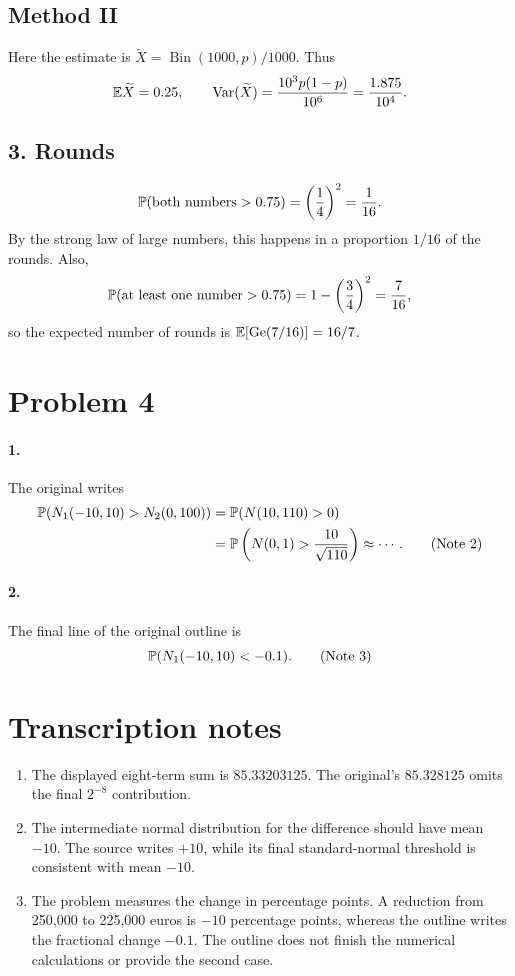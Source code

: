 \documentclass[11pt,a4paper]{article}
\begin{document}
\subsection*{Method II}
Here the estimate is $\widetilde X=\operatorname{Bin}(1000,p)/1000$. Thus
\[
\E\widetilde X=0.25,\qquad
\operatorname{Var}(\widetilde X)=\frac{10^3p(1-p)}{10^6}
=\frac{1.875}{10^4}.
\]
\subsection*{3. Rounds}
\[
\P(\text{both numbers}>0.75)=\left(\frac14\right)^2=\frac1{16}.
\]
By the strong law of large numbers, this happens in a proportion $1/16$ of the rounds.
Also,
\[
\P(\text{at least one number}>0.75)=1-\left(\frac34\right)^2=\frac7{16},
\]
so the expected number of rounds is $\E[\operatorname{Ge}(7/16)]=16/7$.

\section*{Problem 4}
\paragraph{1.} The original writes
\begin{align*}
\P(N_1(-10,10)>N_2(0,100))
&=\P(N(10,110)>0)\\
&=\P\left(N(0,1)>\frac{10}{\sqrt{110}}\right)\approx\cdots.\tag{Note 2}
\end{align*}
\paragraph{2.} The final line of the original outline is
\[
\P(N_1(-10,10)<-0.1).\tag{Note 3}
\]

\section*{Transcription notes}
\begin{enumerate}
\item The displayed eight-term sum is $85.33203125$. The original's $85.328125$ omits the final $2^{-8}$ contribution.
\item The intermediate normal distribution for the difference should have mean $-10$. The source writes $+10$, while its final standard-normal threshold is consistent with mean $-10$.
\item The problem measures the change in percentage points. A reduction from 250,000 to 225,000 euros is $-10$ percentage points, whereas the outline writes the fractional change $-0.1$. The outline does not finish the numerical calculations or provide the second case.
\end{enumerate}
\end{document}
